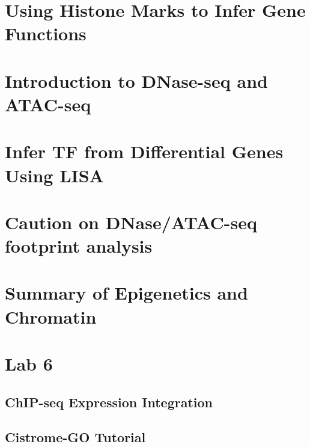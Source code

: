 \documentclass[
]{book}
\begin{document}
\hypertarget{using-histone-marks-to-infer-gene-functions}{%
\section{Using Histone Marks to Infer Gene Functions}\label{using-histone-marks-to-infer-gene-functions}}

\hypertarget{introduction-to-dnase-seq-and-atac-seq}{%
\section{Introduction to DNase-seq and ATAC-seq}\label{introduction-to-dnase-seq-and-atac-seq}}

\hypertarget{infer-tf-from-differential-genes-using-lisa}{%
\section{Infer TF from Differential Genes Using LISA}\label{infer-tf-from-differential-genes-using-lisa}}

\hypertarget{caution-on-dnaseatac-seq-footprint-analysis}{%
\section{Caution on DNase/ATAC-seq footprint analysis}\label{caution-on-dnaseatac-seq-footprint-analysis}}

\hypertarget{summary-of-epigenetics-and-chromatin}{%
\section{Summary of Epigenetics and Chromatin}\label{summary-of-epigenetics-and-chromatin}}

\hypertarget{lab-6}{%
\section{Lab 6}\label{lab-6}}

\hypertarget{chip-seq-expression-integration}{%
\subsection{ChIP-seq Expression Integration}\label{chip-seq-expression-integration}}

\hypertarget{cistrome-go-tutorial}{%
\subsection{Cistrome-GO Tutorial}\label{cistrome-go-tutorial}}
\end{document}
